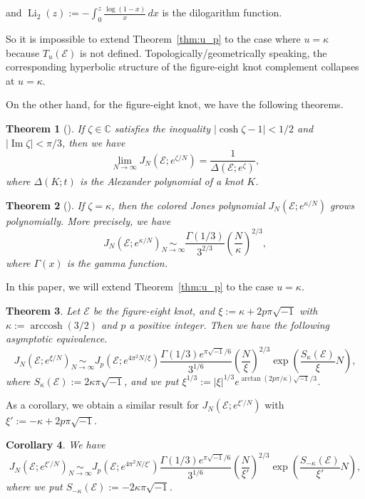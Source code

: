 \documentclass[a4paper,dvipdfmx]{amsart}
\theoremstyle{plain}
\newtheorem{thm}{Theorem}[section]
\newtheorem{cor}[thm]{Corollary}
\theoremstyle{definition}
\theoremstyle{remark}
\newcommand{\C}{\mathbb{C}}
\newcommand{\Li}{\operatorname{Li}}
\newcommand{\arccosh}{\operatorname{arccosh}}
\renewcommand{\Im}{\operatorname{Im}}
\newcommand{\FE}{\mathscr{E}}
\renewcommand{\i}{\sqrt{-1}}
\numberwithin{equation}{section}
\begin{document}
and $\Li_2(z):=-\int_{0}^{z}\frac{\log(1-x)}{x}\,dx$ is the dilogarithm function.
\par
So it is impossible to extend Theorem~\ref{thm:u_p} to the case where $u=\kappa$ because $T_u(\FE)$ is not defined.
Topologically/geometrically speaking, the corresponding hyperbolic structure of the figure-eight knot complement collapses at $u=\kappa$.
\par
On the other hand, for the figure-eight knot, we have the following theorems.
\begin{thm}[\cite{Murakami:JPJGT2007}]
If $\zeta\in\C$ satisfies the inequality $|\cosh\zeta-1|<1/2$ and $|\Im\zeta|<\pi/3$, then we have
\begin{equation*}
  \lim_{N\to\infty}
  J_N(\FE;e^{\zeta/N})
  =
  \frac{1}{\Delta(\FE;e^{\zeta})},
\end{equation*}
where $\Delta(K;t)$ is the Alexander polynomial of a knot $K$.
\end{thm}
\begin{thm}[\cite{Hikami/Murakami:COMCM2008}]
If $\zeta=\kappa$, then the colored Jones polynomial $J_N(\FE;e^{\kappa/N})$ grows polynomially.
More precisely, we have
\begin{equation*}
  J_N\left(\FE;e^{\kappa/N}\right)
  \underset{N\to\infty}{\sim}
  \frac{\Gamma(1/3)}{3^{2/3}}\left(\frac{N}{\kappa}\right)^{2/3},
\end{equation*}
where $\Gamma(x)$ is the gamma function.
\end{thm}
In this paper, we will extend Theorem~\ref{thm:u_p} to the case $u=\kappa$.
\begin{thm}\label{thm:main}
Let $\FE$ be the figure-eight knot, and $\xi:=\kappa+2p\pi\i$ with $\kappa:=\arccosh(3/2)$ and $p$ a positive integer.
Then we have the following asymptotic equivalence.
\begin{equation*}
  J_N\left(\FE;e^{\xi/N}\right)
  \underset{N\to\infty}{\sim}
  J_p\left(\FE;e^{4\pi^2N/\xi}\right)
  \frac{\Gamma(1/3)e^{\pi\i/6}}{3^{1/6}}
  \left(\frac{N}{\xi}\right)^{2/3}\exp\left(\frac{S_{\kappa}(\FE)}{\xi}N\right),
\end{equation*}
where $S_{\kappa}(\FE):=2\kappa\pi\i$, and we put $\xi^{1/3}:=|\xi|^{1/3}e^{\arctan(2p\pi/\kappa)\i/3}$.
\end{thm}
As a corollary, we obtain a similar result for $J_N\left(\FE;e^{\xi'/N}\right)$ with $\xi':=-\kappa+2p\pi\i$.
\begin{cor}\label{cor:conjugate}
We have
\begin{equation*}
  J_N\left(\FE;e^{\xi'/N}\right)
  \underset{N\to\infty}{\sim}
  J_p\left(\FE;e^{4\pi^2N/\xi'}\right)
  \frac{\Gamma(1/3)e^{\pi\i/6}}{3^{1/6}}
  \left(\frac{N}{\xi'}\right)^{2/3}
  \exp\left(\frac{S_{-\kappa}(\FE)}{\xi'}N\right),
\end{equation*}
where we put $S_{-\kappa}(\FE):=-2\kappa\pi\i$.
\end{cor}
\end{document}
